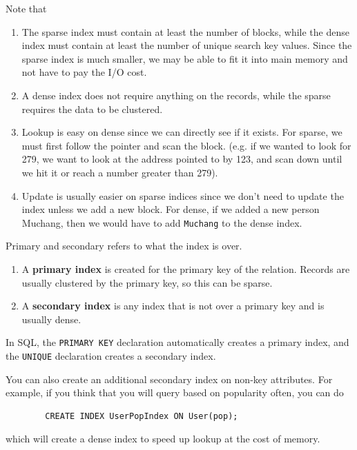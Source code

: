 \documentclass{article}
\begin{document}
\begin{definition}[Index]
      Note that 
      \begin{enumerate}
        \item The sparse index must contain at least the number of blocks, while the dense index must contain at least the number of unique search key values. Since the sparse index is much smaller, we may be able to fit it into main memory and not have to pay the I/O cost. 
        \item A dense index does not require anything on the records, while the sparse requires the data to be clustered. 
        \item Lookup is easy on dense since we can directly see if it exists. For sparse, we must first follow the pointer and scan the block. (e.g. if we wanted to look for 279, we want to look at the address pointed to by 123, and scan down until we hit it or reach a number greater than 279). 
        \item Update is usually easier on sparse indices since we don't need to update the index unless we add a new block. For dense, if we added a new person Muchang, then we would have to add \texttt{Muchang} to the dense index. 
      \end{enumerate}
    \end{definition}

    \begin{definition}
      Primary and secondary refers to what the index is over. 
      \begin{enumerate}
        \item A \textbf{primary index} is created for the primary key of the relation. Records are usually clustered by the primary key, so this can be sparse. 
        \item A \textbf{secondary index} is any index that is not over a primary key and is usually dense. 
      \end{enumerate}
      In SQL, the \texttt{PRIMARY KEY} declaration automatically creates a primary index, and the \texttt{UNIQUE} declaration creates a secondary index. 
    \end{definition}

    \begin{example}
      You can also create an additional secondary index on non-key attributes. For example, if you think that you will query based on popularity often, you can do 
      \begin{lstlisting}
        CREATE INDEX UserPopIndex ON User(pop); 
      \end{lstlisting}
      which will create a dense index to speed up lookup at the cost of memory. 
    \end{example}
\end{document}
